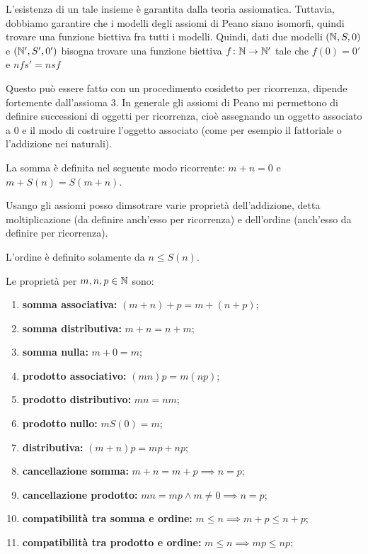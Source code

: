 \documentclass[a4paper]{article}
\begin{document}
L'esistenza di un tale insieme è garantita dalla teoria assiomatica.
Tuttavia, dobbiamo garantire che i modelli degli assiomi di Peano siano isomorfi,
quindi trovare una funzione biettiva fra tutti i modelli.
Quindi, dati due modelli \((\mathbb{N}, S, 0)\) e \((\mathbb{N}', S', 0')\)
bisogna trovare una funzione biettiva \(f\colon \mathbb{N} \to \mathbb{N}'\)
tale che \(f(0) = 0'\) e \(nfs' = nsf\)

\begin{center}
\end{center}

Questo può essere fatto con un procedimento cosidetto per ricorrenza, dipende fortemente
dall'assioma 3. In generale gli assiomi di Peano mi permettono di definire successioni di oggetti
per ricorrenza, cioè assegnando un oggetto associato a \(0\)
e il modo di costruire l'oggetto associato (come per esempio il fattoriale o l'addizione nei naturali).

La somma è definita nel seguente modo ricorrente: \(m+n=0\) e \(m+S(n) = S(m+n)\).

Usango gli assiomi posso dimsotrare varie proprietà dell'addizione, detta moltiplicazione
(da definire anch'esso per ricorrenza) e dell'ordine (anch'esso da definire per ricorrenza).

L'ordine è definito solamente da \(n \leq S(n)\).

Le proprietà per \(m,n,p\in\mathbb{N}\) sono:
\begin{enumerate}
    \item \textbf{somma associativa:} \((m+n)+p = m + (n+p)\);
    \item \textbf{somma distributiva:} \(m + n = n + m\);
    \item \textbf{somma nulla:} \(m + 0 = m\);
    \item \textbf{prodotto associativo:} \((mn)p = m(np)\);
    \item \textbf{prodotto distributivo:} \(mn = nm\);
    \item \textbf{prodotto nullo:} \(m S(0)= m\);
    \item \textbf{distributiva:} \((m+n)p = mp + np\);
    \item \textbf{cancellazione somma:} \(m+n = m+p \implies n=p\);
    \item \textbf{cancellazione prodotto:} \(mn = mp \land m \neq 0 \implies n=p\);
    \item \textbf{compatibilità tra somma e ordine:} \(m\leq n \implies m+p \leq n + p\);
    \item \textbf{compatibilità tra prodotto e ordine:} \(m\leq n \implies mp \leq np\);
\end{enumerate}
\end{document}
